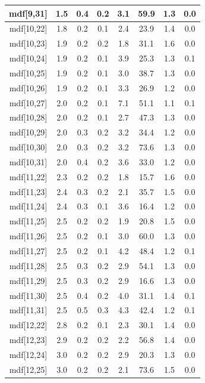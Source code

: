 \begin{longtable}{|c|c|c|c|c|c|c|c|}
\hline
mdf[9,31] & 1.5 & 0.4 & 0.2 & 3.1 & 59.9 & 1.3 & 0.0 \\
\hline
mdf[10,22] & 1.8 & 0.2 & 0.1 & 2.4 & 23.9 & 1.4 & 0.0 \\
\hline
mdf[10,23] & 1.9 & 0.2 & 0.2 & 1.8 & 31.1 & 1.6 & 0.0 \\
\hline
mdf[10,24] & 1.9 & 0.2 & 0.1 & 3.9 & 25.3 & 1.3 & 0.1 \\
\hline
mdf[10,25] & 1.9 & 0.2 & 0.1 & 3.0 & 38.7 & 1.3 & 0.0 \\
\hline
mdf[10,26] & 1.9 & 0.2 & 0.1 & 3.3 & 26.9 & 1.2 & 0.0 \\
\hline
mdf[10,27] & 2.0 & 0.2 & 0.1 & 7.1 & 51.1 & 1.1 & 0.1 \\
\hline
mdf[10,28] & 2.0 & 0.2 & 0.1 & 2.7 & 47.3 & 1.3 & 0.0 \\
\hline
mdf[10,29] & 2.0 & 0.3 & 0.2 & 3.2 & 34.4 & 1.2 & 0.0 \\
\hline
mdf[10,30] & 2.0 & 0.3 & 0.2 & 3.2 & 73.6 & 1.3 & 0.0 \\
\hline
mdf[10,31] & 2.0 & 0.4 & 0.2 & 3.6 & 33.0 & 1.2 & 0.0 \\
\hline
mdf[11,22] & 2.3 & 0.2 & 0.2 & 1.8 & 15.7 & 1.6 & 0.0 \\
\hline
mdf[11,23] & 2.4 & 0.3 & 0.2 & 2.1 & 35.7 & 1.5 & 0.0 \\
\hline
mdf[11,24] & 2.4 & 0.3 & 0.1 & 3.6 & 16.4 & 1.2 & 0.0 \\
\hline
mdf[11,25] & 2.5 & 0.2 & 0.2 & 1.9 & 20.8 & 1.5 & 0.0 \\
\hline
mdf[11,26] & 2.5 & 0.2 & 0.1 & 3.0 & 60.0 & 1.3 & 0.0 \\
\hline
mdf[11,27] & 2.5 & 0.2 & 0.1 & 4.2 & 48.4 & 1.2 & 0.1 \\
\hline
mdf[11,28] & 2.5 & 0.3 & 0.2 & 2.9 & 54.1 & 1.3 & 0.0 \\
\hline
mdf[11,29] & 2.5 & 0.3 & 0.2 & 2.9 & 16.6 & 1.3 & 0.0 \\
\hline
mdf[11,30] & 2.5 & 0.4 & 0.2 & 4.0 & 31.1 & 1.4 & 0.1 \\
\hline
mdf[11,31] & 2.5 & 0.5 & 0.3 & 4.3 & 42.4 & 1.2 & 0.1 \\
\hline
mdf[12,22] & 2.8 & 0.2 & 0.1 & 2.3 & 30.1 & 1.4 & 0.0 \\
\hline
mdf[12,23] & 2.9 & 0.2 & 0.2 & 2.2 & 56.8 & 1.4 & 0.0 \\
\hline
mdf[12,24] & 3.0 & 0.2 & 0.2 & 2.9 & 20.3 & 1.3 & 0.0 \\
\hline
mdf[12,25] & 3.0 & 0.2 & 0.2 & 2.1 & 73.6 & 1.5 & 0.0 \\
\hline

\end{longtable}
